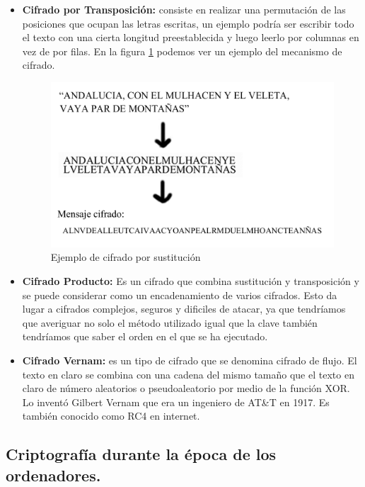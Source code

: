 \begin{itemize}
	\item \textbf{Cifrado por Transposición:} consiste en realizar una permutación de las posiciones que ocupan las letras escritas, un ejemplo podría ser escribir todo el texto con una cierta longitud preestablecida y luego leerlo por columnas en vez de por filas. En la figura \ref{fig:cifradoTransposicion} podemos ver un ejemplo del mecanismo de cifrado.  

\begin{figure}
  \centering
    \includegraphics[scale=0.4]{./ConocimientosPrevios/imagenes/cifradoTransposicion.png}
  \caption{Ejemplo de cifrado por sustitución}
  \label{fig:cifradoTransposicion}
\end{figure}	

	\item \textbf{Cifrado Producto:} Es un cifrado que combina sustitución y transposición y se puede considerar como un encadenamiento de varios cifrados. Esto da lugar a cifrados complejos, seguros y dificiles de atacar, ya que tendríamos que averiguar no solo el método utilizado igual que la clave también tendríamos que saber el orden en el que se ha ejecutado.


	\item \textbf{Cifrado Vernam:} es un tipo de cifrado que se denomina cifrado de flujo. El texto en claro se combina con una cadena del mismo tamaño que el texto en claro de número aleatorios o pseudoaleatorio por medio de la función XOR. Lo inventó Gilbert Vernam que era un ingeniero de AT\&T en 1917. Es también conocido como RC4 en internet.  
	
\end{itemize}

\subsection{Criptografía durante la época de los ordenadores.}

